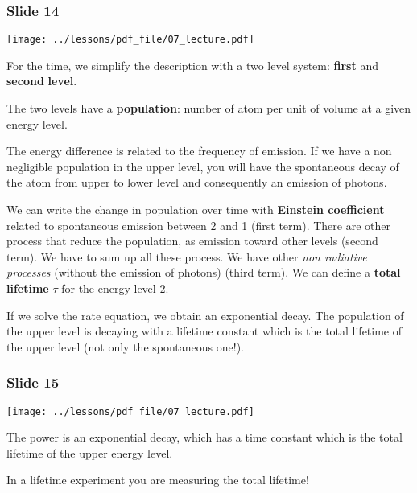 \documentclass[../main/main.tex]{subfiles}
\begin{document}
\subsubsection*{Slide 14}

\begin{minipage}[]{0.5\linewidth}
\centering
\texttt{[image: ../lessons/pdf\_file/07\_lecture.pdf]}
\end{minipage}
\hspace{0.3cm}\vspace{0.3cm}
\begin{minipage}[c]{0.47\linewidth}

For the time, we simplify the description with a two level system: \textbf{first} and \textbf{second} \textbf{level}.

The two levels have a \textbf{population}: number of atom per unit of volume at a given energy level.

The energy difference is related to the frequency of emission. If we have a non negligible population in the upper level, you will have the spontaneous decay of the atom from upper to lower level and consequently an emission of photons.

We can write the change in population over time with \textbf{Einstein coefficient} related to spontaneous emission between 2 and 1 (first term).
There are other process that reduce the population, as emission toward other levels (second term). We have to sum up all these process. We have other \emph{non radiative processes} (without the emission of photons) (third term).
We can define a \textbf{total lifetime} \( \tau  \) for the energy level 2.

\end{minipage}

If we solve the rate equation, we obtain an exponential decay. The population of the upper level is decaying with a lifetime constant which is the total lifetime of the upper level (not only the spontaneous one!).

\subsubsection*{Slide 15}

\begin{minipage}[]{0.5\linewidth}
\centering
\texttt{[image: ../lessons/pdf\_file/07\_lecture.pdf]}
\end{minipage}
\hspace{0.3cm}\vspace{0.3cm}
\begin{minipage}[c]{0.47\linewidth}

The power is an exponential decay, which has a time constant which is the total lifetime of the upper energy level.

In a lifetime experiment you are measuring the total lifetime!

\end{minipage}
\end{document}
